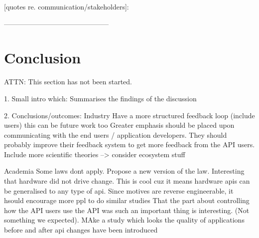 \documentclass{sig-alternate}
\begin{document}
       [quotes re. communication/stakeholders]:




---------------------------------------------




















\section{Conclusion} \label{conclusion}
ATTN: This section has not been started. 

1. Small intro which: Summarises the findings of the discussion

2. Conclusions/outcomes:
Industry
Have a more structured feedback loop (include users) this can be future work too
              Greater emphasis should be placed upon communicating with the end users / application developers. They should probably improve their feedback system to get more feedback from the API users.
              Include more scientific theories
              --> consider ecosystem stuff

Academia
Some laws dont apply. Propose a new version of the law.
Interesting that hardware did not drive change. This is cool cuz it means hardware apis can be generalised to any type of api.
Since motives are reverse engineerable, it hsould encourage more ppl to do similar studies
That the part about controlling how the API users use the API was such an important thing is interesting. (Not something we expected). 
       MAke a study which looks the quality of applications before and after api changes have been introduced
\end{document}
